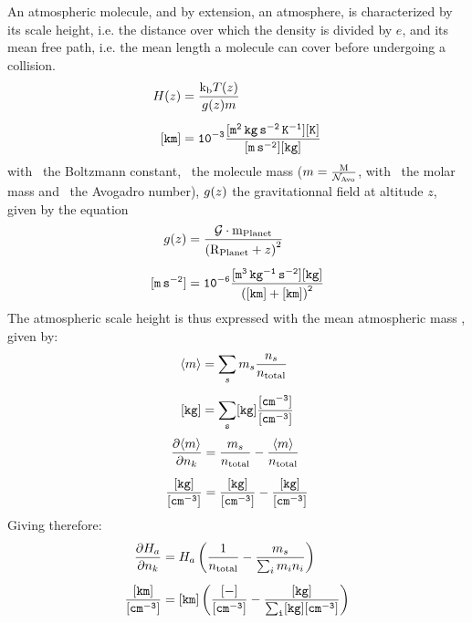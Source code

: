 An atmospheric molecule, and by extension, an atmosphere, is characterized by
its scale height, i.e. the distance over which the density is divided by $e$, and
its mean free path, i.e. the mean length a molecule can cover before undergoing
a collision.
\begin{equation}
\begin{split}
H(z)  &    = \frac{\text{k}_\text{b} T(z)}{g(z)m} \\[5pt]
\tt [km] &\tt = 10^{-3} \frac{[\mathtt{m^2\,kg\,s^{-2}\,K^{-1}}] [K]}{[m\,s^{-2}][kg]}
\end{split}
\label{scale_height}
\end{equation}
with \kb\ the Boltzmann constant, 
\mass\ the molecule mass ($m = \frac{\text{M}}{\mathcal{N}_\text{Avo}}$, with
\Mm\ the molar mass and \Nav\ the Avogadro number), 
$g(z)$ the gravitationnal field at altitude $z$, given by the equation
\begin{equation}
\begin{split}
g(z)        &     = \frac{\mathcal{G}\cdot\text{m}_\text{Planet}}{\left(\text{R}_\text{Planet} + z\right)^2} \\[5pt]
\tt [m\,s^{-2}] & \tt = 10^{-6} \frac{[\mathtt{m^3\,kg^{-1}\,s^{-2}}] [kg]}{\left([km] + [km]\right)^2}
\end{split}
\label{gfield}
\end{equation}
%
The atmospheric scale height is thus expressed with the mean atmospheric
mass , given by:
\begin{equation}
\begin{split}
\langle m\rangle & = \sum_s m_s \frac{n_s}{n_\text{total}} \\[5pt]
\tt [kg] & \tt = \sum_s [kg] \frac{[cm^{-3}]}{[cm^{-3}]}
\end{split}
\end{equation}
%
\begin{equation}
\begin{split}
\frac{\partial\langle m\rangle}{\partial n_k} & = \frac{m_s}{n_\text{total}} - \frac{\langle m\rangle}{n_\text{total}}
\\[5pt]
\tt \frac{[kg]}{[cm^{-3}]} & \tt = \frac{[kg]}{[cm^{-3}]} - \frac{[kg]}{[cm^{-3}]}
\end{split}
\end{equation}
%
Giving therefore:
\begin{equation}
\begin{split}
\frac{\partial H_a}{\partial n_k}   &     =  H_a\left(\frac{1}{n_\text{total}} - \frac{m_s}{\sum_im_in_i}\right) \\[5pt]
\tt \frac{[km]}{[cm^{-3}]} & \tt =  [km]\left(\frac{[-]}{[cm^{-3}]} - \frac{[kg]}{\sum_i[kg][cm^{-3}]}\right)
\end{split}
\end{equation}

